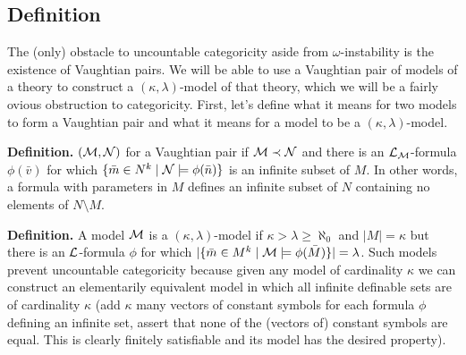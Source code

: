 \subsection{Definition}
The (only) obstacle to uncountable categoricity aside from \(\omega\)-instability is the existence of Vaughtian pairs.
We will be able to use a Vaughtian pair of models of a theory to construct a \((\kappa, \lambda)\)-model of that theory, which we will be a fairly ovious obstruction to categoricity.  
First, let's define what it means for two models to form a Vaughtian pair and what it means for a model to be a \((\kappa, \lambda)\)-model.

\textbf{Definition.} \((\mathcal{M}, \mathcal{N})\) for a Vaughtian pair if \(\mathcal{M} \prec \mathcal{N}\) and there is an \(\mathcal{L}_{\mathcal{M}}\)-formula \(\phi(\bar{v})\) for which
\(\{\bar{m} \in N^k \mid \mathcal{N} \models \phi(\bar{n})\}\) is an infinite subset of \(M\). 
In other words, a formula with parameters in \(M\) defines an infinite subset of \(N\) containing no elements of \(N \setminus M\).

\textbf{Definition.} A model \(\mathcal{M}\) is a \((\kappa, \lambda)\)-model if \(\kappa > \lambda \geq \aleph_0\) and \(|M| = \kappa\) but there is an \(\mathcal{L}\)-formula \(\phi\) for which
\(|\{\bar{m} \in M^k \mid \mathcal{M} \models \phi(\bar{M})\}| = \lambda\).
Such models prevent uncountable categoricity because given any model of cardinality \(\kappa\) we can construct an elementarily equivalent model in which all infinite definable sets are of cardinality \(\kappa\) (add \(\kappa\) many vectors of constant symbols for each formula \(\phi\) defining an infinite set, assert that none of the (vectors of) constant symbols are equal. This is clearly finitely satisfiable and its model has the desired property).


